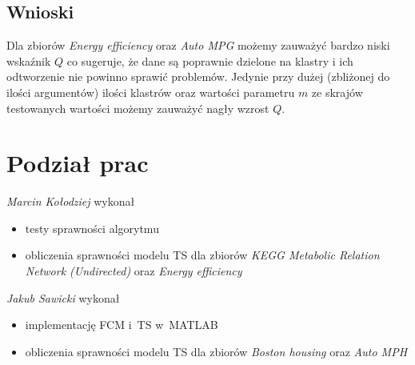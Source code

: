 \documentclass[a4paper; 11pt]{article}
\begin{document}
\subsection{Wnioski}
Dla zbiorów \emph{Energy efficiency} oraz \emph{Auto MPG} możemy zauważyć bardzo niski wskaźnik $Q$ co sugeruje,
że dane są poprawnie dzielone na klastry i ich odtworzenie nie powinno sprawić problemów. Jedynie przy dużej
(zbliżonej do ilości argumentów) ilości klastrów oraz wartości parametru $m$ ze skrajów testowanych wartości
możemy zauważyć nagły wzrost $Q$.

\section{Podział prac}

\emph{Marcin Kołodziej} wykonał
\begin{itemize}
\item testy sprawności algorytmu
\item obliczenia sprawności modelu TS dla zbiorów \emph{KEGG Metabolic Relation Network (Undirected)} oraz \emph{Energy efficiency}
\end{itemize}

\emph{Jakub Sawicki} wykonał
\begin{itemize}
\item implementację FCM i~TS w~MATLAB
\item obliczenia sprawności modelu TS dla zbiorów \emph{Boston housing} oraz \emph{Auto MPH}
\end{itemize}
\end{document}
